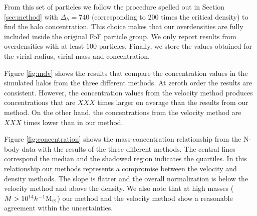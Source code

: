\documentclass[useAMS,usenatbib]{mn2e}
\newcommand{\hMsun}{{\ifmmode{h^{-1}{\rm
        {M_{\odot}}}}\else{$h^{-1}{\rm{M_{\odot}}}$~}\fi}}
\begin{document}
From this set of particles we follow the procedure spelled out in
Section \ref{sec:method} with $\Delta_h=740$  (corresponding to $200$
times the critical density) to find the halo concentration.
This choice makes that our overdensities are fully included inside the
original FoF particle group.
We only report results from overdensities with at least $100$ particles.
Finally, we store the values obtained for the virial radius, virial
mass and concentration.

Figure \ref{fig:mdv} shows the results that compare the concentration
values in the simulated halos from the three different methods.
At zeroth order the results are consistent.
However, the concentration values from the velocity method produces
concentrations that are $XXX$ times larger on average than the results
from our method.
On the other hand, the concentrations from the velocity method are
$XXX$ times lower than in our method.



Figure \ref{fig:concentration} shows the mass-concentration
relationship from the N-body data with the results of the three
different methods.
The central lines correspond the median and the
shadowed region indicates the quartiles.
In this relationship our methods represents a compromise between the
velocity and density methods.
The slope is flatter and the overall normalization is below the
velocity method and above the density.
We also note that at high masses ($M>10^{14}\hMsun$) our method 
and the velocity method show a reasonable agreement within the
uncertainties. 
 
\end{document}
